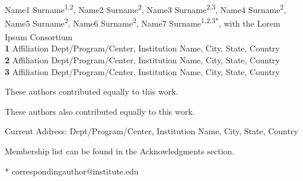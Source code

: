 \documentclass[10pt,letterpaper]{article}
\begin{document}
\vspace*{0.2in}

\begin{flushleft}
{\Large
\textbf{} %
}
\newline
\\
Name1 Surname\textsuperscript{1,2\Yinyang},
Name2 Surname\textsuperscript{2\Yinyang},
Name3 Surname\textsuperscript{2,3\textcurrency},
Name4 Surname\textsuperscript{2},
Name5 Surname\textsuperscript{2\ddag},
Name6 Surname\textsuperscript{2\ddag},
Name7 Surname\textsuperscript{1,2,3*},
with the Lorem Ipsum Consortium\textsuperscript{\textpilcrow}
\\
\bigskip
\textbf{1} Affiliation Dept/Program/Center, Institution Name, City, State, Country
\\
\textbf{2} Affiliation Dept/Program/Center, Institution Name, City, State, Country
\\
\textbf{3} Affiliation Dept/Program/Center, Institution Name, City, State, Country
\\
\bigskip

% 
%
\Yinyang These authors contributed equally to this work.

\ddag These authors also contributed equally to this work.

\textcurrency Current Address: Dept/Program/Center, Institution Name, City, State, Country %

\textpilcrow Membership list can be found in the Acknowledgments section.

* correspondingauthor@institute.edu



\end{flushleft}
\end{document}
